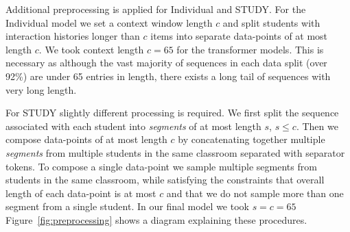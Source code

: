 \documentclass{article}
\begin{document}
Additional preprocessing is applied for Individual and STUDY. For the Individual model we set a context window length $c$ and split students with interaction histories longer than $c$ items into separate data-points of at most length $c$. We took context length $c=65$ for the transformer models. This is necessary as although the vast majority of sequences in each data split (over 92\%) are under 65 entries in length, there exists a long tail of sequences with very long length. 

For STUDY slightly different processing is required. We first split the sequence associated with each student into \textit{segments} of at most length $s$, $s\leq c$. Then we compose data-points of at most length $c$ by concatenating together multiple \textit{segments} from multiple students in the same classroom separated with separator tokens. To compose a single data-point we sample multiple segments from students in the same classroom, while satisfying the constraints that overall length of each data-point is at most $c$ and that we do not sample more than one segment from a single student. In our final model we took $s=c=65$ Figure~\ref{fig:preprocessing} shows a diagram explaining these procedures.
\FloatBarrier
\end{document}
